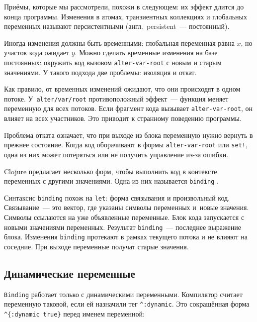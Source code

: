 
Приёмы, которые мы рассмотрели, похожи в следующем: их эффект длится до конца
программы. Изменения в атомах, транзиентных коллекциях и глобальных переменных
называют персистентными (англ.~persistent~--- постоянный).

Иногда изменения должны быть временными: глобальная переменная равна $x$, но
участок кода ожидает $y$. Можно сделать временные изменения на базе постоянных:
окружить код вызовом \verb|alter-var-root| с новым и старым значениями. У
такого подхода две проблемы: изоляция и откат.


Как правило, от временных изменений ожидают, что они происходят в одном
потоке. У~\texttt{alter\-/var\-/root} противоположный эффект~--- функция меняет
переменную для всех потоков. Если фрагмент кода вызывает \verb|alter-var-root|,
он влияет на всех участников. Это приводит к странному поведению программы.

Проблема отката означает, что при выходе из блока переменную нужно вернуть в прежнее
состояние. Когда код оборачивают в формы \verb|alter-var-root| или \verb|set!|, одна
из них может потеряться или не получить управление из-за ошибки.

Clojure предлагает несколько форм, чтобы выполнить код в контексте переменных с
другими значениями. Одна из них называется \verb|binding| .


Синтаксис \verb|binding| похож на \verb|let|: форма связывания и произвольный
код. Связывание~--- это вектор, где указаны символы переменных и~новые
значения. Символы ссылаются на уже объявленные переменные. Блок кода запускается
с новыми значениями переменных. Результат \verb|binding|~--- последнее выражение
блока. Изменения \verb|binding| протекают в рамках текущего потока и не влияют
на соседние. При выходе переменные получат старые значения.

\subsection{Динамические переменные}

\label{dynamic-vars}


\verb|Binding| работает только с динамическими переменными. Компилятор считает
переменную таковой, если ей назначили тег \verb|^:dynamic|. Это сокращённая
форма \verb|^{:dynamic true}| перед именем переменной:

